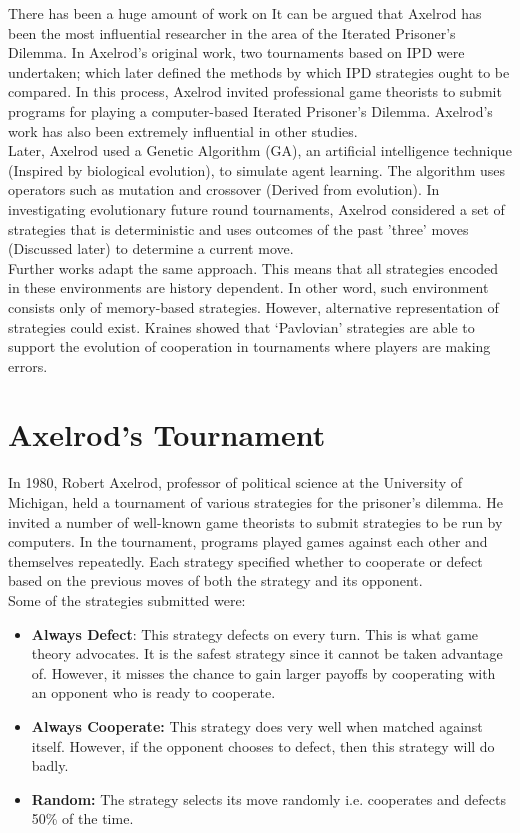\documentclass[a4paper]{article}
\begin{document}
	There has been a huge amount of work on It can be argued that Axelrod has been the most influential researcher in the area of the Iterated Prisoner's Dilemma. In Axelrod's original work, two tournaments based on IPD were undertaken; which later defined the methods by which IPD strategies ought to be compared. In this process, Axelrod invited professional game theorists to submit programs for playing a computer-based Iterated Prisoner's Dilemma. Axelrod's work has also been extremely influential in other studies.\\
	Later, Axelrod used a Genetic Algorithm (GA), an artificial intelligence technique (Inspired by biological evolution), to simulate agent learning. The algorithm uses operators such as mutation and crossover (Derived from evolution). In investigating evolutionary future round tournaments, Axelrod considered a set of strategies that is deterministic and uses outcomes of the past 'three' moves (Discussed later) to determine a current move.\\
	Further works adapt the same approach. This means that all strategies encoded in these environments are history dependent. In other word, such environment consists only of memory-based strategies. However, alternative representation of strategies could exist. Kraines showed that ‘Pavlovian’ strategies are able to support the evolution of cooperation in tournaments where players are making errors. 
	
	\section{Axelrod's Tournament}

	In 1980, Robert Axelrod, professor of political science at the University of Michigan, held a tournament of various strategies for the prisoner's dilemma. He invited a number of well-known game theorists to submit strategies to be run by computers. In the tournament, programs played games against each other and themselves repeatedly. Each strategy specified whether to cooperate or defect based on the previous moves of both the strategy and its opponent.\\
	Some of the strategies submitted were:
	\begin{itemize}
	\item \textbf{Always Defect}: This strategy defects on every turn. This is what game theory advocates. It is the safest strategy since it cannot be taken advantage of. However, it misses the chance to gain larger payoffs by cooperating with an opponent who is ready to cooperate.
	\item \textbf{Always Cooperate:} This strategy does very well when matched against itself. However, if the opponent chooses to defect, then this strategy will do badly.
	\item \textbf{Random:} The strategy selects its move randomly i.e. cooperates and defects 50\% of the time.
	\end{itemize}
	
\end{document}
